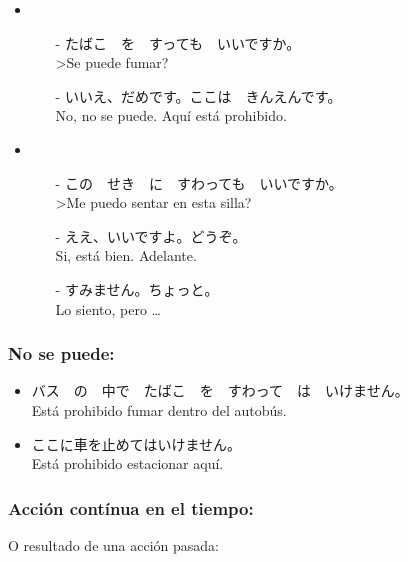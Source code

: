 \documentclass[a4paper,12pt,oneside]{report}
\def\bv{\textbf{V}} %
\begin{document}
\begin{CJK*}{UTF8}{min}
        \begin{itemize}
          \item
            \begin{itemize}
              \item[-] たばこ　を　すっても　いいですか。\\
                       >Se puede fumar?
              \item[-] いいえ、だめです。ここは　きんえんです。\\
                       No, no se puede. Aqu\'i est\'a prohibido.
            \end{itemize}
          \item
            \begin{itemize}
              \item[-] この　せき　に　すわっても　いいですか。\\
                       >Me puedo sentar en esta silla?
              \item[-] ええ、いいですよ。どうぞ。\\
                       Si, est\'a bien. Adelante.
              \item[-] すみません。ちょっと。\\
                       Lo siento, pero \ldots
            \end{itemize}
        \end{itemize}

      \subsubsection{No se puede:}
        \fbox{\bv(て) は　いけません}

        \begin{itemize}
          \item バス　の　中で　たばこ　を　すわって　は　いけません。\\
                Est\'a prohibido fumar dentro del autob\'us.
          \item ここに車を止めてはいけません。\\
                Est\'a prohibido estacionar aqu\'i.
        \end{itemize}

      \subsubsection{Acci\'on cont\'inua en el tiempo:}
        O resultado de una acci\'on pasada:\\


\end{CJK*}
\end{document}
